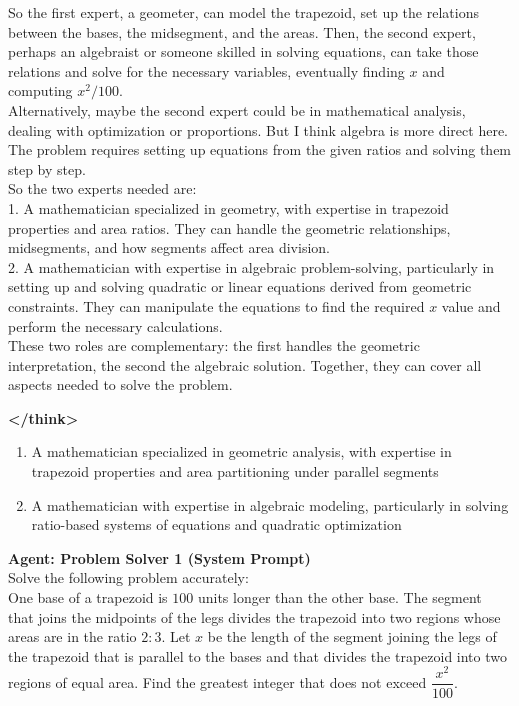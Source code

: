 \begin{tcolorbox}[
  title=Multiagent Collaborative Reasoning Trace Data Sample,
  breakable,
  colback=white,
  colframe=black
]
So the first expert, a geometer, can model the trapezoid, set up the relations between the bases, the midsegment, and the areas. Then, the second expert, perhaps an algebraist or someone skilled in solving equations, can take those relations and solve for the necessary variables, eventually finding \(x\) and computing \(x^2/100\).\\[1ex]

Alternatively, maybe the second expert could be in mathematical analysis, dealing with optimization or proportions. But I think algebra is more direct here. The problem requires setting up equations from the given ratios and solving them step by step.\\[1ex]

So the two experts needed are:\\[1ex]

1. A mathematician specialized in geometry, with expertise in trapezoid properties and area ratios. They can handle the geometric relationships, midsegments, and how segments affect area division.\\[1ex]

2. A mathematician with expertise in algebraic problem-solving, particularly in setting up and solving quadratic or linear equations derived from geometric constraints. They can manipulate the equations to find the required \(x\) value and perform the necessary calculations.\\[1ex]

These two roles are complementary: the first handles the geometric interpretation, the second the algebraic solution. Together, they can cover all aspects needed to solve the problem.

\textbf{\textless/think\textgreater}

\begin{enumerate}
  \item A mathematician specialized in geometric analysis, with expertise in trapezoid properties and area partitioning under parallel segments  
  \item A mathematician with expertise in algebraic modeling, particularly in solving ratio-based systems of equations and quadratic optimization  
\end{enumerate}

\vspace{1em}

\textcolor{olivegreen}{\textbf{Agent: Problem Solver 1 (System Prompt)}} \\
Solve the following problem accurately: \\[1ex]
One base of a trapezoid is $100$ units longer than the other base. The segment that joins the midpoints of the legs divides the trapezoid into two regions whose areas are in the ratio $2:3$. Let $x$ be the length of the segment joining the legs of the trapezoid that is parallel to the bases and that divides the trapezoid into two regions of equal area. Find the greatest integer that does not exceed $\dfrac{x^2}{100}$. \\[2ex]


\end{tcolorbox}
